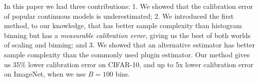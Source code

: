 In this paper we had three contributions: 1. We showed that the calibration error of popular continuous models is underestimated; 2. We introduced the first method, to our knowledge, that has better sample complexity than histogram binning but has a \emph{measurable calibration error}, giving us the best of both worlds of scaling and binning; and 3. We showed that an alternative estimator has better sample complexity than the commonly used plugin estimator. Our method gives us 35\% lower calibration error on CIFAR-10, and up to 5x lower calibration error on ImageNet, when we use $B = 100$ bins.
\newpage




